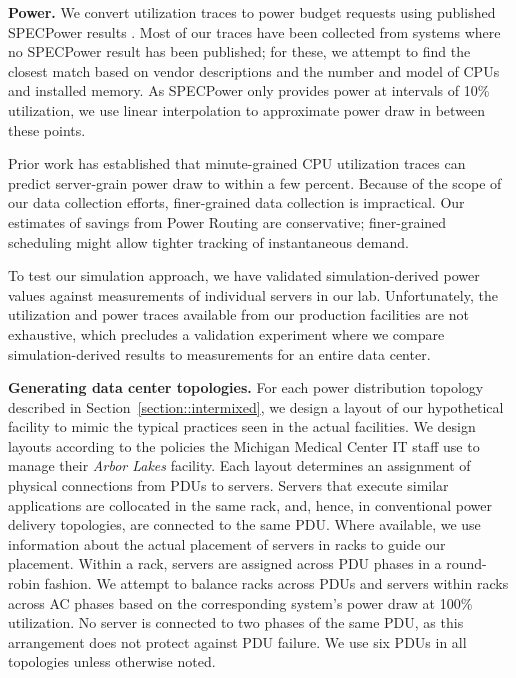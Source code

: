 {\bf Power.}  We convert utilization traces to power budget requests using published SPECPower results \cite{SpecPower}.  Most of our traces have been collected from systems where no SPECPower result has been published; for these, we attempt to find the closest match based on vendor descriptions and the number and model of CPUs and installed memory. As SPECPower only provides power at intervals of 10\% utilization, we use linear interpolation to approximate power draw in between these points.

Prior work \cite{Fan07,Ranganathan06} has established that minute-grained CPU utilization traces can predict server-grain power 
draw to within a few percent.   Because of the scope of our data collection efforts, finer-grained data collection is impractical.  Our estimates of savings from Power Routing are conservative; finer-grained scheduling might allow tighter tracking of instantaneous demand.  

To test our simulation approach, we have validated simulation-derived power values against measurements of individual servers in our lab.    Unfortunately, the utilization and power traces available from our production facilities are not exhaustive, which precludes a validation experiment where we compare simulation-derived results to measurements for an entire data center.
 
{\bf Generating data center topologies.} For each power distribution topology described in Section~\ref{section::intermixed}, we design a layout of our hypothetical facility to mimic the typical practices seen in the actual facilities. We design layouts according to the policies the Michigan Medical Center IT staff use to manage their \emph{Arbor Lakes} facility. Each layout determines an assignment of physical connections from PDUs to servers. Servers that execute similar applications are collocated in the same rack, and, hence, in conventional power delivery topologies, are connected to the same PDU.  Where available, we use information about the actual placement of servers in racks to guide our placement.  Within a rack, servers are assigned across PDU phases in a round-robin fashion.  We attempt to balance racks across PDUs and servers within racks across AC phases based on the corresponding system's power draw at 100\% utilization.  No server is connected to two phases of the same PDU, as this arrangement does not protect against PDU failure.  We use six PDUs in all topologies unless otherwise noted.

